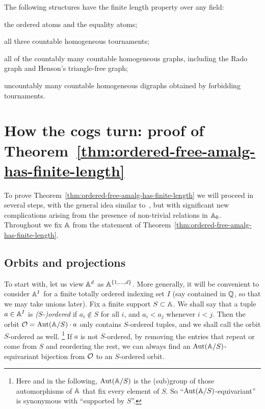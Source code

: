 \begin{corollary}\label{cor:lachlan-woodrow}
    The following structures have the finite length property over any field:
    \begin{romanenumerate}
        \item the ordered atoms and the equality atoms;
        \item all three \cite{Lachlan1984} countable homogeneous tournaments;
        \item all of the countably many \cite{LachlanWoodrow_80} countable homogeneous graphs, including the Rado graph and Henson's triangle-free graph;
        \item uncountably many \cite[Thm.~2.4]{Henson1972} countable homogeneous digraphs obtained by forbidding tournaments.
    \end{romanenumerate}
\end{corollary}



\section{How the cogs turn: proof of Theorem~\ref{thm:ordered-free-amalg-has-finite-length}}\label{sec:cogs-turn}
To prove Theorem~\ref{thm:ordered-free-amalg-has-finite-length} we will proceed in several steps, 
with the general idea similar to~\cite[Sec.~4.1]{BFKM24}, 
but with significant new complications arising from the presence of non-trivial relations in $\A_0$.
Throughout we fix $\A$ from the statement of Theorem~\ref{thm:ordered-free-amalg-has-finite-length}.

\subsection{Orbits and projections}
To start with, let us view $\A^d$ as $\A^{\{1, \dots, d\}}$. 
More generally, it will be convenient to consider $\A^I$ for a finite totally ordered indexing set $I$ 
(say contained in $\Q$, so that we may take unions later).
Fix a finite support $S \subset \A$.
We shall say that a tuple $a\in\A^I$ is {\em ($S$-)ordered} if $a_i \not\in S$ for all $i$, and $a_i < a_j$ whenever $i < j$. 
Then the orbit $\cal O = \Aut(\A/S) \cdot a$ only contains $S$-ordered tuples, 
and we shall call the orbit $S$-ordered as well.%
\footnote{Here and in the following, $\Aut(\A/S)$ is the (sub)group of those automorphisms of $\A$ that fix every element of $S$. 
So ``$\Aut(\A/S)$-equivariant'' is synonymous with ``supported by $S$''.}
If $a$ is not $S$-ordered, by removing the entries that repeat or come from $S$ and reordering the rest, 
we can always find an $\Aut(\A/S)$-equivariant bijection from $\cal O$ to an $S$-ordered orbit.

